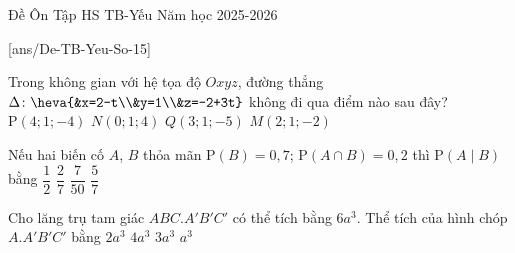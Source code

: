 \begin{name}
{Đề Ôn Tập HS TB-Yếu}
{Năm học 2025-2026}
\end{name}

[ans/De-TB-Yeu-So-15]
\TN
\begin{ex}%
	Trong không gian với hệ tọa độ $Oxyz$, đường thẳng $\Delta \colon \heva{&x=2-t\\&y=1\\&z=-2+3t}$ không đi qua điểm nào sau đây?
	\choice
	{\True $\mathrm{P}(4;1;-4)$}
	{$N(0;1;4)$}
	{$Q(3;1;-5)$}
	{$M(2;1;-2)$}
\end{ex}

\begin{ex}%
	Nếu hai biến cố $A$, $B$ thỏa mãn $\mathrm{P}(B)=0{,}7$; $\mathrm{P}(A\cap B)=0{,}2$ thì $\mathrm{P}(A\mid B)$ bằng
	\choice
	{$\dfrac{1}{2}$}
	{\True $\dfrac{2}{7}$}
	{$\dfrac{7}{50}$}
	{$\dfrac{5}{7}$}
\end{ex}

\begin{ex}%
	Cho lăng trụ tam giác $ABC.A'B'C'$ có thể tích bằng $6a^3$. Thể tích của hình chóp $A.A'B'C'$ bằng
	\choice
	{\True $2a^3$}
	{$4a^3$}
	{$3a^3$}
	{$a^3$}
\end{ex}

